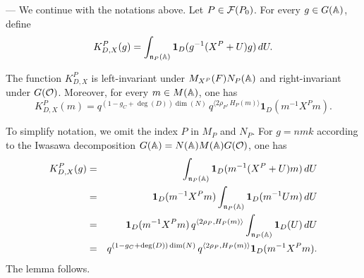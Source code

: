 \begin{paragr}[Functions $K^P_{D,X}$.] ---\label{S:KPDX}
We continue with the notations above. Let $P\in \mathcal{F}(P_0)$. For every $g\in G(\mathbb{A})$, define
\begin{equation}
  \label{eq:KPDX}
   K^{P}_{D,X}(g)= \int_{\mathfrak{n}_P(\mathbb{A})} \mathbf{1}_{D}(g^{-1}( X^P +U)g)\, dU.
\end{equation}
  
\begin{lemme}\label{lem:KPX}
The function $K^{P}_{D,X}$ is left-invariant under $M_{X^P}(F)N_P(\mathbb{A})$ and right-invariant under $G(\mathcal{O})$. Moreover, for every $m\in M(\mathbb{A})$, one has 
$$K^{P}_{D,X}(m)=q^{(1-g_C+\deg(D))\dim(N)} \, q^{\langle 2\rho_P,H_P(m)\rangle} \mathbf{1}_{D}(m^{-1}X^P m).$$
\end{lemme}

\begin{preuve}
To simplify notation, we omit the index $P$ in $M_P$ and $N_P$. For $g=nmk$ according to the Iwasawa decomposition $G(\mathbb{A})=N(\mathbb{A})M(\mathbb{A})G(\mathcal{O})$, one has 
\begin{eqnarray*}
  K^P_{D,X}(g)&=&\int_{\mathfrak{n}_P(\mathbb{A})} \mathbf{1}_{D}(m^{-1}( X^P +U) m) \, dU \\
&=& \mathbf{1}_{D}(m^{-1}X^P m) \int_{\mathfrak{n}_P(\mathbb{A})} \mathbf{1}_{D}(m^{-1}U m) \, dU\\
&=& \mathbf{1}_{D}(m^{-1}X^P m) \, q^{\langle 2\rho_P,H_P(m)\rangle}\int_{\mathfrak{n}_P(\mathbb{A})} \mathbf{1}_{D}(U ) \, dU \\
&=& q^{(1-g_C+\deg(D))\dim(N)} \, q^{\langle 2\rho_P,H_P(m)\rangle} \mathbf{1}_{D}(m^{-1}X^P m).
\end{eqnarray*}
The lemma follows.
\end{preuve}
\end{paragr}

